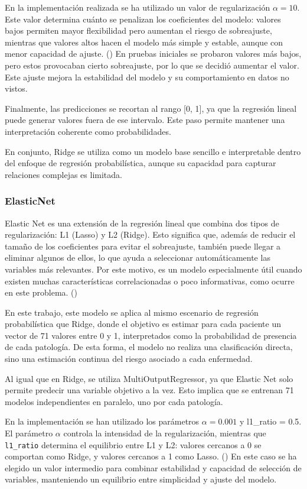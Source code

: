 \documentclass[12pt,a4paper,twoside]{book}
\begin{document}
En la implementación realizada se ha utilizado un valor de regularización $\alpha = 10$. 
Este valor determina cuánto se penalizan los coeficientes del modelo: valores bajos permiten mayor flexibilidad pero aumentan el riesgo de sobreajuste, mientras que valores altos hacen el modelo más simple y estable, aunque con menor capacidad de ajuste. (\cite{sklearn_ridge})
En pruebas iniciales se probaron valores más bajos, pero estos provocaban cierto sobreajuste, por lo que se decidió aumentar el valor. 
Este ajuste mejora la estabilidad del modelo y su comportamiento en datos no vistos.

Finalmente, las predicciones se recortan al rango [0, 1], ya que la regresión lineal puede generar valores fuera de ese intervalo. 
Este paso permite mantener una interpretación coherente como probabilidades.

En conjunto, Ridge se utiliza como un modelo base sencillo e interpretable dentro del enfoque de regresión probabilística, aunque su capacidad para capturar relaciones complejas es limitada.

\subsubsection*{ElasticNet}

Elastic Net es una extensión de la regresión lineal que combina dos tipos de regularización: L1 (Lasso) y L2 (Ridge). 
Esto significa que, además de reducir el tamaño de los coeficientes para evitar el sobreajuste, también puede llegar a eliminar algunos de ellos, lo que ayuda a seleccionar automáticamente las variables más relevantes. 
Por este motivo, es un modelo especialmente útil cuando existen muchas características correlacionadas o poco informativas, como ocurre en este problema. (\cite{interactivechaos_elasticnet})

En este trabajo, este modelo se aplica al mismo escenario de regresión probabilística que Ridge, donde el objetivo es estimar para cada paciente un vector de 71 valores entre 0 y 1, interpretados como la probabilidad de presencia de cada patología. 
De esta forma, el modelo no realiza una clasificación directa, sino una estimación continua del riesgo asociado a cada enfermedad.

Al igual que en Ridge, se utiliza MultiOutputRegressor, ya que Elastic Net solo permite predecir una variable objetivo a la vez. 
Esto implica que se entrenan 71 modelos independientes en paralelo, uno por cada patología.

En la implementación se han utilizado los parámetros $\alpha = 0.001$ y l1\_ratio = 0.5. El parámetro $\alpha$ controla la intensidad de la regularización, mientras que \texttt{l1\_ratio} determina el equilibrio entre L1 y L2: valores cercanos a 0 se comportan como Ridge, y valores cercanos a 1 como Lasso. (\cite{sklearn_elasticnet})
En este caso se ha elegido un valor intermedio para combinar estabilidad y capacidad de selección de variables, manteniendo un equilibrio entre simplicidad y ajuste del modelo.
\end{document}
